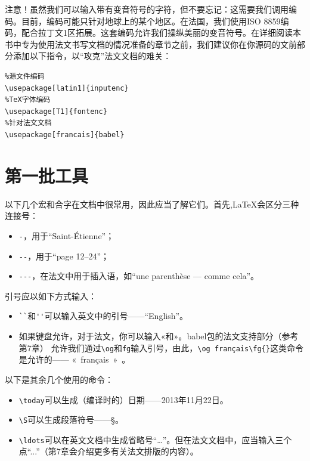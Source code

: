 注意！虽然我们可以输入带有变音符号的字符，但不要忘记：这需要我们调用编码。目前，编码可能只针对地球上的某个地区。在法国，我们使用ISO 8859编码，配合拉丁文1区拓展。这套编码允许我们操纵美丽的变音符号。在详细阅读本书中专为使用法文书写文档的情况准备的章节之前，我们建议你在你源码的文前部分添加以下指令，以“攻克”法文文档的难关：

\begin{dmd}
    \begin{verbatim}
%源文件编码
\usepackage[latin1]{inputenc}
%TeX字体编码
\usepackage[T1]{fontenc}
%针对法文文档
\usepackage[francais]{babel}
    \end{verbatim}
\end{dmd}

\section{第一批工具}

以下几个宏和合字在文档中很常用，因此应当了解它们。首先,\LaTeX 会区分三种连接号：

\begin{itemize}
    \item \verb|-|，用于“Saint-Étienne”；
    \item \verb|--|，用于“page 12--24”；
    \item \verb|---|，在法文中用于插入语，如“une parenthèse --- comme cela”。
\end{itemize}

引号应以如下方式输入：

\begin{itemize}
    \item \verb|``|和\verb|''|可以输入英文中的引号——``English''。
    \item 如果键盘允许，对于法文，你可以输入«和»。\textsf{babel}包的法文支持部分（参考第7章）%
    允许我们通过\verb|\og|和\verb|fg|输入引号，由此，\verb|\og français\fg{}|这类命令是允许的—— «~français~»~。
\end{itemize}

以下是其余几个使用的命令：

\begin{itemize}
    \item \verb|\today|可以生成（编译时的）日期——2013年11月22日。
    \item \verb|\S|可以生成段落符号——\S。
    \item \verb|\ldots|可以在英文文档中生成省略号“\ldots”。但在法文文档中，应当输入三个点“...”（第7章会介绍更多有关法文排版的内容）。%
\end{itemize}

